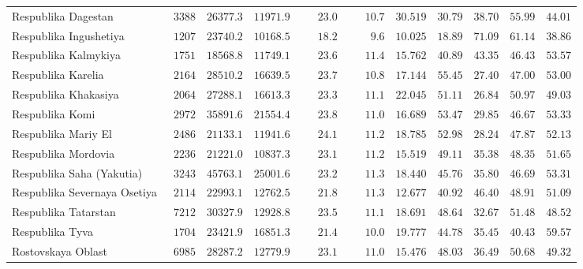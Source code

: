 \documentclass[alpha-refs]{wiley-article-03v}
\begin{document}
{\begin{longtable}{lcccccccccc}
		Respublika Dagestan  & $\phantom{0}3388$ & $26377.3$ & $11971.9$ & $\phantom{000}23.0$ & $\phantom{000}10.7$ & $30.519$ & $30.79$ & $38.70$ & $55.99$ & $44.01$ \\
		Respublika Ingushetiya  & $\phantom{0}1207$ & $23740.2$ & $10168.5$ & $\phantom{000}18.2$ & $\phantom{0000}9.6$ & $10.025$ & $18.89$ & $71.09$ & $61.14$ & $38.86$ \\
		Respublika Kalmykiya  & $\phantom{0}1751$ & $18568.8$ & $11749.1$ & $\phantom{000}23.6$ & $\phantom{000}11.4$ & $15.762$ & $40.89$ & $43.35$ & $46.43$ & $53.57$ \\
		Respublika Karelia  & $\phantom{0}2164$ & $28510.2$ & $16639.5$ & $\phantom{000}23.7$ & $\phantom{000}10.8$ & $17.144$ & $55.45$ & $27.40$ & $47.00$ & $53.00$ \\
		Respublika Khakasiya  & $\phantom{0}2064$ & $27288.1$ & $16613.3$ & $\phantom{000}23.3$ & $\phantom{000}11.1$ & $22.045$ & $51.11$ & $26.84$ & $50.97$ & $49.03$ \\
		Respublika Komi  & $\phantom{0}2972$ & $35891.6$ & $21554.4$ & $\phantom{000}23.8$ & $\phantom{000}11.0$ & $16.689$ & $53.47$ & $29.85$ & $46.67$ & $53.33$ \\
		Respublika Mariy El  & $\phantom{0}2486$ & $21133.1$ & $11941.6$ & $\phantom{000}24.1$ & $\phantom{000}11.2$ & $18.785$ & $52.98$ & $28.24$ & $47.87$ & $52.13$ \\
		Respublika Mordovia  & $\phantom{0}2236$ & $21221.0$ & $10837.3$ & $\phantom{000}23.1$ & $\phantom{000}11.2$ & $15.519$ & $49.11$ & $35.38$ & $48.35$ & $51.65$ \\
		Respublika Saha (Yakutia)  & $\phantom{0}3243$ & $45763.1$ & $25001.6$ & $\phantom{000}23.2$ & $\phantom{000}11.3$ & $18.440$ & $45.76$ & $35.80$ & $46.69$ & $53.31$ \\
		Respublika Severnaya Osetiya  & $\phantom{0}2114$ & $22993.1$ & $12762.5$ & $\phantom{000}21.8$ & $\phantom{000}11.3$ & $12.677$ & $40.92$ & $46.40$ & $48.91$ & $51.09$ \\
		Respublika Tatarstan  & $\phantom{0}7212$ & $30327.9$ & $12928.8$ & $\phantom{000}23.5$ & $\phantom{000}11.1$ & $18.691$ & $48.64$ & $32.67$ & $51.48$ & $48.52$ \\
		Respublika Tyva  & $\phantom{0}1704$ & $23421.9$ & $16851.3$ & $\phantom{000}21.4$ & $\phantom{000}10.0$ & $19.777$ & $44.78$ & $35.45$ & $40.43$ & $59.57$ \\
		Rostovskaya Oblast  & $\phantom{0}6985$ & $28287.2$ & $12779.9$ & $\phantom{000}23.1$ & $\phantom{000}11.0$ & $15.476$ & $48.03$ & $36.49$ & $50.68$ & $49.32$ \\

\end{longtable}}
\end{document}
